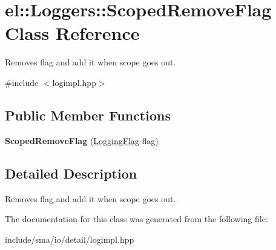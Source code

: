 \hypertarget{classel_1_1Loggers_1_1ScopedRemoveFlag}{\section{el\-:\-:Loggers\-:\-:Scoped\-Remove\-Flag Class Reference}
\label{classel_1_1Loggers_1_1ScopedRemoveFlag}
}


Removes flag and add it when scope goes out.  




{\ttfamily \#include $<$logimpl.\-hpp$>$}

\subsection*{Public Member Functions}
\begin{DoxyCompactItemize}
\item 
\hypertarget{classel_1_1Loggers_1_1ScopedRemoveFlag_a7ae9a1cde34e1145d8b90b639cc12dc1}{{\bfseries Scoped\-Remove\-Flag} (\hyperlink{namespaceel_a2784aacd04cb7816ac1c0b20fcbf83cb}{Logging\-Flag} flag)}\label{classel_1_1Loggers_1_1ScopedRemoveFlag_a7ae9a1cde34e1145d8b90b639cc12dc1}

\end{DoxyCompactItemize}


\subsection{Detailed Description}
Removes flag and add it when scope goes out. 

The documentation for this class was generated from the following file\-:\begin{DoxyCompactItemize}
\item 
include/sma/io/detail/logimpl.\-hpp\end{DoxyCompactItemize}
